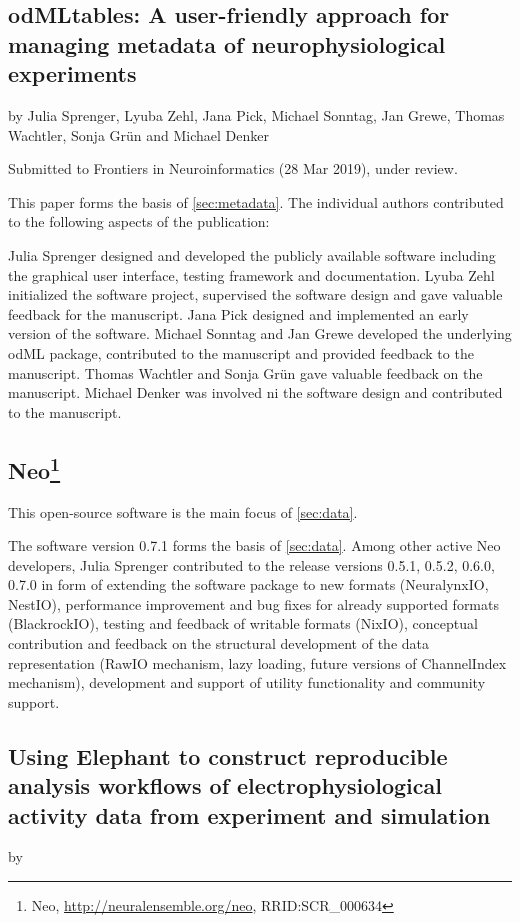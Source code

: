 \subsection*{odMLtables: A user-friendly approach for managing metadata of neurophysiological experiments}
by Julia Sprenger, Lyuba Zehl, Jana Pick, Michael Sonntag, Jan Grewe, Thomas Wachtler, Sonja Grün and Michael Denker

Submitted to Frontiers in Neuroinformatics (28 Mar 2019), under review.

This paper forms the basis of \ref{sec:metadata}. The individual authors contributed to the following aspects of the publication:

Julia Sprenger designed and developed the publicly available software including the graphical user interface, testing framework and documentation. Lyuba Zehl initialized the software project, supervised the software design and gave valuable feedback for the manuscript. Jana Pick designed and implemented an early version of the software. Michael Sonntag and Jan Grewe developed the underlying odML package, contributed to the manuscript and provided feedback to the manuscript. Thomas Wachtler and Sonja Grün gave valuable feedback on the manuscript. Michael Denker was involved ni the software design and contributed to the manuscript.

\subsection*{Neo\footnote{Neo, \url{http://neuralensemble.org/neo}, RRID:SCR\_000634} \citep{neo09}}
This open-source software is the main focus of \ref{sec:data}. 

The software version 0.7.1 forms the basis of \ref{sec:data}. Among other active Neo developers, Julia Sprenger contributed to the release versions 0.5.1, 0.5.2, 0.6.0, 0.7.0 in form of extending the software package to new formats (NeuralynxIO, NestIO), performance improvement and bug fixes for already supported formats (BlackrockIO), testing and feedback of writable formats (NixIO), conceptual contribution and feedback on the structural development of the data representation (RawIO mechanism, lazy loading, future versions of ChannelIndex mechanism), development and support of utility functionality and community support.

\subsection*{Using Elephant to construct reproducible analysis workflows of electrophysiological activity data from experiment and simulation}
by 

